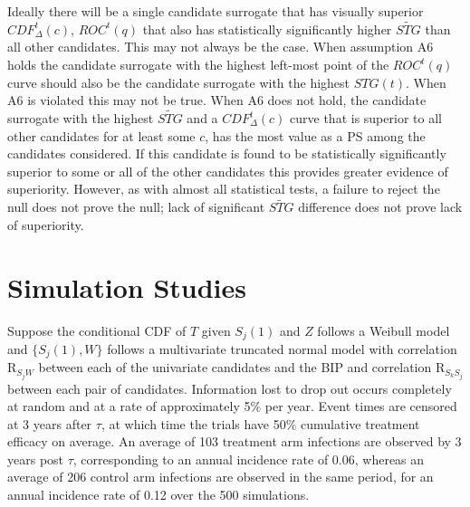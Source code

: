 \documentclass[times, doublespace]{simauth}
\begin{document}
Ideally there will be a single candidate surrogate that has visually superior $CDF^{t}_{\Delta}(c)$, $ROC^{t}(q)$ that also has statistically significantly higher $\widetilde{STG}$ than all other candidates. This may not always be the case. When assumption A6 holds the candidate surrogate with the highest left-most point of the $ROC^{t}(q)$ curve should also be the candidate surrogate with the highest $STG(t)$. When A6 is violated this may not be true. When A6 does not hold, the candidate surrogate with the highest $\widetilde{STG}$ and a $CDF^{t}_{\Delta}(c)$ curve that is superior to all other candidates for at least some $c$, has the most value as a PS among the candidates considered. If this candidate is found to be statistically significantly superior to some or all of the other candidates this provides greater evidence of superiority. However, as with almost all statistical tests, a failure to reject the null does not prove the null; lack of significant  $\widetilde{STG}$ difference does not prove lack of superiority.

\section{Simulation Studies}
Suppose the conditional CDF of $T$ given $S_j(1)$ and $Z$ follows a Weibull model and $\{S_j(1),W\}$ follows a multivariate truncated normal model with correlation R$_{S_jW}$ between each of the univariate candidates and the BIP and correlation R$_{S_kS_j}$ between each pair of candidates. Information lost to drop out occurs completely at random and at a rate of approximately 5\% per year. Event times are censored at 3 years after $\tau$, at which time the trials have 50\% cumulative treatment efficacy on average. An average of 103 treatment arm infections are observed by 3 years post $\tau$, corresponding to an annual incidence rate of 0.06, whereas an average of 206 control arm infections are observed in the same period, for an annual incidence rate of 0.12 over the 500 simulations. 
\end{document}
